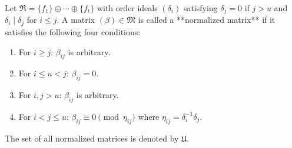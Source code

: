 Let $\mathfrak{R} = \{f_1\} \oplus \cdots \oplus \{f_t\}$ with order ideals $(\delta_i)$ satisfying $\delta_j = 0$ if $j > u$ and $\delta_i \mid \delta_j$ for $i \leq j$. A matrix $(\beta) \in \mathfrak{M}$ is called a **normalized matrix** if it satisfies the following four conditions:
\begin{enumerate}
\item For $i \geq j$: $\beta_{ij}$ is arbitrary.
\item For $i \leq u < j$: $\beta_{ij} = 0$.
\item For $i, j > u$: $\beta_{ij}$ is arbitrary.
\item For $i < j \leq u$: $\beta_{ij} \equiv 0 \pmod{\eta_{ij}}$ where $\eta_{ij} = \delta_i^{-1} \delta_j$.
\end{enumerate}
The set of all normalized matrices is denoted by $\mathfrak{U}$.
